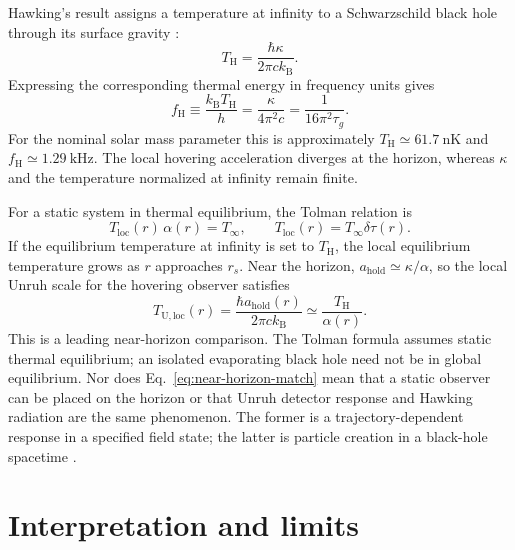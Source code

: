 \documentclass[12pt]{article}
\begin{document}
Hawking's result assigns a temperature at infinity to a Schwarzschild black hole through its surface gravity \cite{Hawking}:
\begin{equation}
  T_{\mathrm{H}}
  =\frac{\hbar\kappa}{2\pi c k_{\mathrm{B}}}.
  \label{eq:hawking-temperature}
\end{equation}
Expressing the corresponding thermal energy in frequency units gives
\begin{equation}
  f_{\mathrm{H}}\equiv\frac{k_{\mathrm{B}}T_{\mathrm{H}}}{h}
  =\frac{\kappa}{4\pi^2c}
  =\frac{1}{16\pi^2\tau_g}.
  \label{eq:hawking-frequency}
\end{equation}
For the nominal solar mass parameter this is approximately $T_{\mathrm{H}}\simeq61.7\ \mathrm{nK}$ and $f_{\mathrm{H}}\simeq1.29\ \mathrm{kHz}$. The local hovering acceleration diverges at the horizon, whereas $\kappa$ and the temperature normalized at infinity remain finite.

For a static system in thermal equilibrium, the Tolman relation is \cite{Tolman}
\begin{equation}
  T_{\mathrm{loc}}(r)\,\alpha(r)=T_{\infty},
  \qquad
  T_{\mathrm{loc}}(r)=T_{\infty}\delta\tau(r).
  \label{eq:tolman}
\end{equation}
If the equilibrium temperature at infinity is set to $T_{\mathrm{H}}$, the local equilibrium temperature grows as $r$ approaches $r_s$. Near the horizon, $a_{\mathrm{hold}}\simeq\kappa/\alpha$, so the local Unruh scale for the hovering observer satisfies
\begin{equation}
  T_{\mathrm{U,loc}}(r)
  =\frac{\hbar a_{\mathrm{hold}}(r)}{2\pi c k_{\mathrm{B}}}
  \simeq\frac{T_{\mathrm{H}}}{\alpha(r)}.
  \label{eq:near-horizon-match}
\end{equation}
This is a leading near-horizon comparison. The Tolman formula assumes static thermal equilibrium; an isolated evaporating black hole need not be in global equilibrium. Nor does Eq.~\eqref{eq:near-horizon-match} mean that a static observer can be placed on the horizon or that Unruh detector response and Hawking radiation are the same phenomenon. The former is a trajectory-dependent response in a specified field state; the latter is particle creation in a black-hole spacetime \cite{Unruh,Tolman,Hawking}.

\section{Interpretation and limits}
\end{document}
